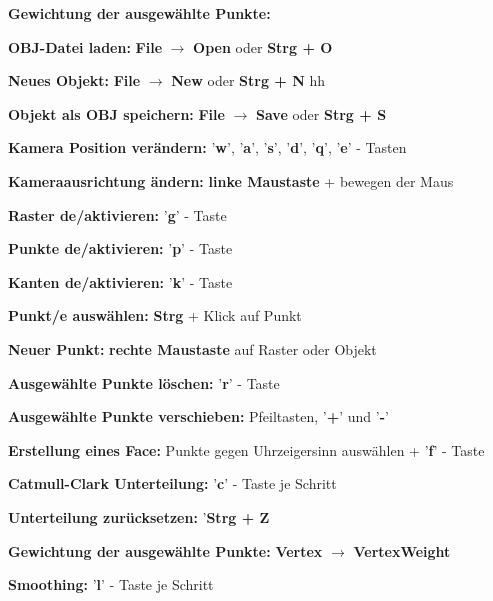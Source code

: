 \begin{labeling}[]{\textbf{Gewichtung der ausgewählte Punkte:}}%
\item [\textbf{OBJ-Datei laden:}] \textbf{File} $\rightarrow$ \textbf{Open} oder \textbf{Strg + O}
\item [\textbf{Neues Objekt:}] \textbf{File} $\rightarrow$ \textbf{New} oder \textbf{Strg + N}
hh \item [\textbf{Objekt als OBJ speichern:}] \textbf{File} $\rightarrow$ \textbf{Save} oder \textbf{Strg + S}
\newline
\item [\textbf{Kamera Position verändern:}] '\textbf{w}', '\textbf{a}', '\textbf{s}', '\textbf{d}', '\textbf{q}', '\textbf{e}' - Tasten
\item [\textbf{Kameraausrichtung ändern:}] \textbf{linke Maustaste} + bewegen der Maus
\newline
\item [\textbf{Raster de/aktivieren:}] '\textbf{g}' - Taste
\item [\textbf{Punkte de/aktivieren:}] '\textbf{p}' - Taste
\item [\textbf{Kanten de/aktivieren:}] '\textbf{k}' - Taste
\newline
\item [\textbf{Punkt/e auswählen:}] \textbf{Strg} + Klick auf Punkt
\item [\textbf{Neuer Punkt:}] \textbf{rechte Maustaste} auf Raster oder Objekt
\item [\textbf{Ausgewählte Punkte löschen:}] '\textbf{r}' - Taste
\item [\textbf{Ausgewählte Punkte verschieben:}] Pfeiltasten, '\textbf{+}' und '\textbf{-}'
\newline
\item [\textbf{Erstellung eines Face:}] Punkte gegen Uhrzeigersinn auswählen + '\textbf{f}' - Taste
\newline
\item [\textbf{Catmull-Clark Unterteilung:}] '\textbf{c}' - Taste je Schritt
\item [\textbf{Unterteilung zurücksetzen:}] '\textbf{Strg + Z}
\newline
\item [\textbf{Gewichtung der ausgewählte Punkte:}] \textbf{Vertex} $\rightarrow$ \textbf{VertexWeight}
\newline
\item [\textbf{Smoothing:}] '\textbf{l}' - Taste je Schritt
\end{labeling}

